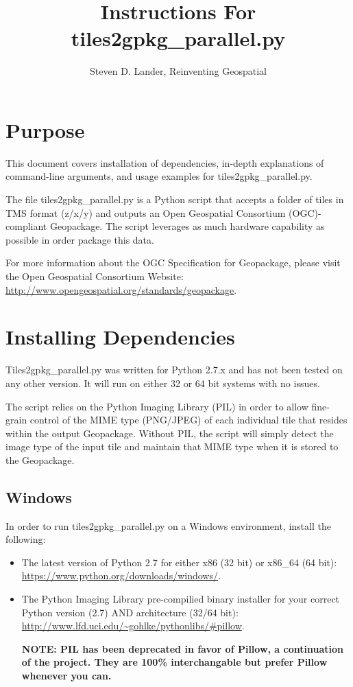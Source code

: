 \documentclass{article}
\title{Instructions For tiles2gpkg\_parallel.py}
\author{Steven D. Lander, Reinventing Geospatial}
\begin{document}
\maketitle

\section{Purpose}
This document covers installation of dependencies, in-depth explanations of
command-line arguments, and usage examples for tiles2gpkg\_parallel.py.

The file tiles2gpkg\_parallel.py is a Python script that accepts a folder of
tiles in TMS format (z/x/y) and outputs an Open Geospatial Consortium (OGC)-
compliant Geopackage.  The script leverages as much hardware capability as
possible in order package this data.

For more information about the OGC Specification for Geopackage, please visit
the Open Geospatial Consortium Website:
\url{http://www.opengeospatial.org/standards/geopackage}.

\section{Installing Dependencies}
Tiles2gpkg\_parallel.py was written for Python 2.7.x and has not been tested on
any other version.  It will run on either 32 or 64 bit systems with no issues.

The script relies on the Python Imaging Library (PIL) in order to allow
fine-grain control of the MIME type (PNG/JPEG) of each individual tile that
resides within the output Geopackage.  Without PIL, the script will simply
detect the image type of the input tile and maintain that MIME type when it
is stored to the Geopackage.
\subsection{Windows}
In order to run tiles2gpkg\_parallel.py on a Windows environment, install
the following:
\begin{itemize}
    \item
        The latest version of Python 2.7 for either x86 (32 bit) or x86\_64
        (64 bit): 
        \url{https://www.python.org/downloads/windows/}.
    \item
        The Python Imaging Library pre-compilied binary installer for your
        correct Python version (2.7) AND architecture (32/64 bit):
        \url{http://www.lfd.uci.edu/~gohlke/pythonlibs/#pillow}.

        \bf{NOTE: PIL has been deprecated in favor of Pillow, a continuation of
        the project.  They are 100\% interchangable but prefer Pillow
        whenever you can.}
\end{itemize}
\end{document}
